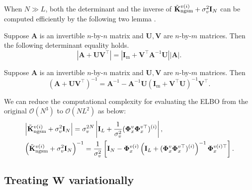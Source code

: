 When $N \gg L$, both the determinant and the inverse of $\tilde{{\mathbf K}}_{\text{ngsm}}^{v (i)} + \sigma_v^2 \mathbf{I}_N$ can be computed efficiently by the following two lemma \citep{williams2006gaussian}.
\begin{lemma}
Suppose $\mathbf{A}$ is an invertible $n$-by-$n$ matrix and $\mathbf{U}, \mathbf{V}$ are $n$-by-$m$ matrices. Then the following determinant equality holds.
$$
\left|\mathbf{A}+\mathbf{U} \mathbf{V}^{\top}\right|=\left|\mathbf{I}_{\mathrm{m}}+\mathbf{V}^{\top} \mathbf{A}^{-1} \mathbf{U}\right| \left|\mathbf{A}\right|.
$$
\end{lemma}
\begin{lemma}
\label{Lemma:Woodbury_matrix_identity}
    Suppose $\mathbf{A}$ is an invertible $n$-by-$n$ matrix and $\mathbf{U}, \mathbf{V}$ are $n$-by-$m$ matrices. Then
$$
\left(\mathbf{A}+\mathbf{U} \mathbf{V}^{\top}\right)^{-1}=\mathbf{A}^{-1} - \mathbf{A}^{-1}\mathbf{U} (\mathbf{I}_{\mathrm{m}} + \mathbf{V}^\top \mathbf{U})^{-1} \mathbf{V}^\top.
$$
\end{lemma}
We can reduce the computational complexity for evaluating the \MakeUppercase{elbo} from the original $\mathcal{O}(N^3)$ to $\mathcal{O}(NL^2)$ as below:
\begin{align}
    & \left| \tilde{{\mathbf K}}_{\text{ngsm}}^{v (i)} + \sigma_v^2 \mathbf{I}_N \right| = \sigma_v^{2N} \left| \mathbf{I}_{L} + \frac{1}{\sigma_v^2} (\boldsymbol \Phi_{x}^{v} \boldsymbol \Phi_{x}^{v \top})^{(i)}\right|, \\
    & \left( \tilde{{\mathbf K}}_{\text{ngsm}}^{v (i)} + \sigma_v^2 \mathbf{I}_N \right)^{-1} = \frac{1}{\sigma_v^2} \left[ \mathbf{I}_N - \boldsymbol \Phi_{x}^{v(i)} \left( \mathbf{I}_{L} + (\boldsymbol \Phi_{x}^{v} \boldsymbol \Phi_{x}^{v \top})^{(i)} \right)^{-1} \boldsymbol \Phi_{x}^{v(i) \top} \right].
\end{align}

\subsection{Treating $\mathbf{W}$ variationally}
\label{app:set_of_w}


